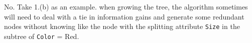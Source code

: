 No. Take 1.(b) as an example. when growing the tree, the algorithm sometimes will need to deal with a tie in information gains and generate some redundant nodes without knowing like the node with the splitting attribute \texttt{Size} in the subtree of \texttt{Color} = Red.  
